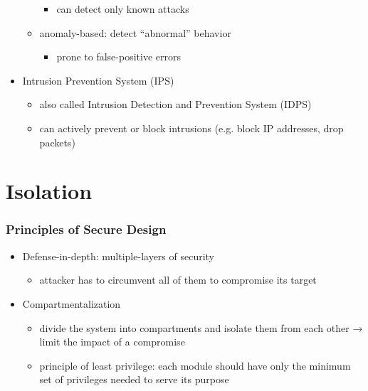 \documentclass[final]{article}
\begin{document}
\begin{itemize}[nosep]
\begin{itemize}
\begin{itemize}[nosep]
                        \item can detect only known attacks
                    \end{itemize}
              \item anomaly-based: detect ``abnormal'' behavior
                    \begin{itemize}[nosep]
                        \item prone to false-positive errors
                    \end{itemize}
          \end{itemize}
    \item Intrusion Prevention System (IPS)
          \begin{itemize}[nosep]
              \item also called Intrusion Detection and Prevention System (IDPS)
              \item can actively prevent or block intrusions (e.g. block IP addresses, drop packets)
          \end{itemize}
\end{itemize}
\section{Isolation}
\subsubsection*{Principles of Secure Design}
\begin{itemize}[nosep]
    \item Defense-in-depth: multiple-layers of security
          \begin{itemize}[nosep]
              \item attacker has to circumvent all of them to compromise its target
          \end{itemize}
    \item Compartmentalization
          \begin{itemize}[nosep]
              \item divide the system into compartments and isolate them from each other → limit the impact of a compromise
              \item principle of least privilege: each module should have only the minimum set of privileges needed to serve its purpose
          \end{itemize}
\end{itemize}
\end{document}
